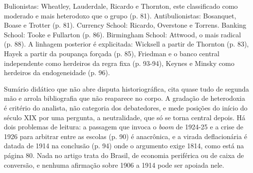 Bulionistas: Wheatley, Lauderdale, Ricardo e Thornton, este classificado como
moderado e mais heterodoxo que o grupo (p. 81). Antibulionistas: Bosanquet,
Boase e Trotter (p. 81). Currency School: Ricardo, Overstone e Torrens. Banking
School: Tooke e Fullarton (p. 86). Birmingham School: Attwood, o mais radical
(p. 88). A linhagem posterior é explicitada: Wicksell a partir de Thornton
(p. 83), Hayek a partir da poupança forçada (p. 85), Friedman e o banco central
independente como herdeiros da regra fixa (p. 93-94), Keynes e Minsky como
herdeiros da endogeneidade (p. 96).

Sumário didático que não abre disputa historiográfica, cita quase tudo de
segunda mão e arrola bibliografia que não reaparece no corpo. A gradação de
heterodoxia é critério do analista, não categoria dos debatedores, e mede
posições do início do século XIX por uma pergunta, a neutralidade, que só se
torna central depois. Há dois problemas de leitura: a passagem que invoca o
\emph{boom} de 1924-25 e a crise de 1926 para arbitrar entre as escolas (p. 90)
é anacrônica, e a virada deflacionária é datada de 1914 na conclusão (p. 94)
onde o argumento exige 1814, como está na página 80. Nada no artigo trata do
Brasil, de economia periférica ou de caixa de conversão, e nenhuma afirmação
sobre 1906 a 1914 pode ser apoiada nele.

